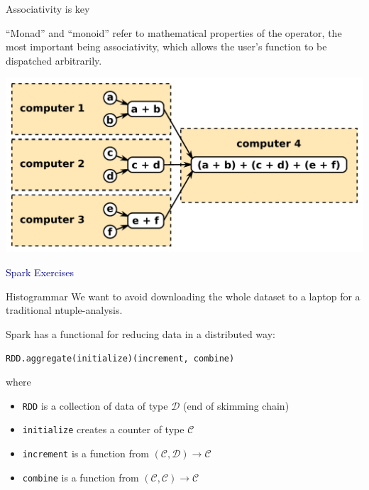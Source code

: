 \documentclass{beamer}
\begin{document}
\begin{frame}{Associativity is key}

``Monad'' and ``monoid'' refer to mathematical properties of the operator, the most important being associativity, which allows the user's function to be dispatched arbitrarily.

\begin{center}
\includegraphics[width=0.7\linewidth]{monoids.pdf}
\end{center}
\end{frame}

\begin{frame}{}
\begin{center}
\Huge \textcolor{darkblue}{Spark Exercises}
\end{center}
\end{frame}

\begin{frame}[fragile]{Histogrammar}
We want to avoid downloading the whole dataset to a laptop for a traditional ntuple-analysis.

\vspace{0.5 cm}
Spark has a functional for reducing data in a distributed way:

\begin{center}
\tt \small RDD.aggregate(initialize)(increment, combine)
\end{center}

where
\begin{itemize}
\item {\tt \small RDD} is a collection of data of type $\mathcal{D}$ (end of skimming chain)
\item {\tt \small initialize} creates a counter of type $\mathcal{C}$
\item {\tt \small increment} is a function from $(\mathcal{C},\mathcal{D}) \to \mathcal{C}$
\item {\tt \small combine} is a function from $(\mathcal{C},\mathcal{C}) \to \mathcal{C}$
\end{itemize}
\end{frame}
\end{document}
